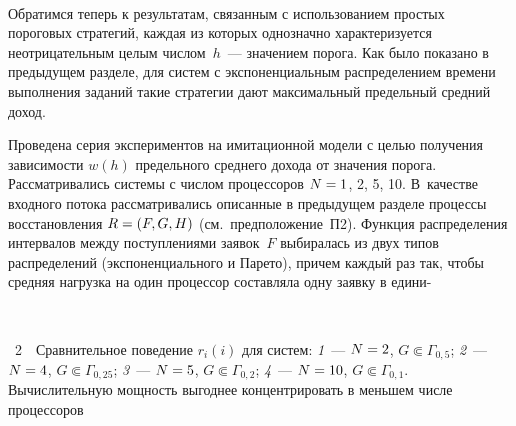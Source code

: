 \begin{multicols}{2}
  \begin{figure*} %
   \vspace*{1pt}
 \begin{center}
 \mbox{%
 \epsfxsize=127.324mm
 }
 \end{center}
 \vspace*{-6pt}
\end{figure*}



  Обратимся теперь к результатам, связанным с использованием простых пороговых 
стратегий, каж\-дая из которых однозначно характеризуется неотрица\-тель\-ным целым 
чис\-лом~$h$~--- значением порога. Как было показано в предыдущем разделе, для систем 
с экспоненциальным рас\-пре\-делением времени выполнения заданий такие страте\-гии дают 
максимальный предельный средний доход. 

Про\-ведена серия экспериментов на 
имитационной модели с целью получения за\-ви\-си\-мости $w(h)$ предельного среднего 
дохода от значения по\-ро\-га. Рассматривались системы с чис\-лом процессоров 
$N\hm=1$, 2, 5, 10. В~качестве входного потока рас\-смат\-ри\-ва\-лись описанные в предыдущем 
разделе процессы восстановления $R\hm=(F,G,H)$ (см.\ предположение~П2). Функция распределения 
интервалов между поступлениями заявок~$F$ выбиралась из двух типов распределений 
(экспоненциального и Парето), причем каждый раз так, чтобы средняя нагрузка на один 
процессор составляла одну заявку в едини-\linebreak\vspace*{-12pt}
\begin{center}  %
\mbox{%
 \epsfxsize=70.591mm
 }
  \end{center}
  
  \vspace*{-3pt}
  
\noindent
{{\figurename~2}\ \ \small{Сравнительное поведение $r_i(i)$ для систем:
\textit{1}~--- $N\hm=2$, $G\Subset \Gamma_{0{,}5}$; 
\textit{2}~--- $N\hm=4$, $G\Subset \Gamma_{0{,}25}$; 
\textit{3}~--- $N\hm=5$, $G\Subset\Gamma_{0{,}2}$; 
\textit{4}~--- $N\hm=10$, $G\Subset \Gamma_{0{,}1}$.
Вычислительную мощность выгоднее концентрировать в меньшем числе процессоров}}

\vspace*{12pt}


\end{multicols}
